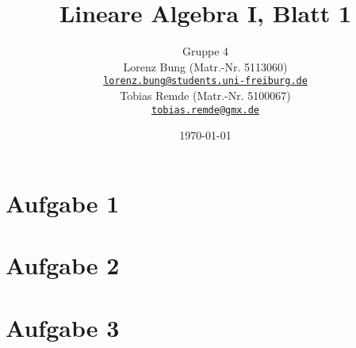 \documentclass[12pt,a4paper]{article}
\title{Lineare Algebra I, Blatt 1}
\author{Gruppe 4\\
    Lorenz Bung (Matr.-Nr. 5113060)\\
    \href{mailto:lorenz.bung@students.uni-freiburg.de}{\texttt{lorenz.bung@students.uni-freiburg.de}}\\
    Tobias Remde (Matr.-Nr. 5100067)\\
    \href{mailto:tobias.remde@gmx.de}{\texttt{tobias.remde@gmx.de}}
}
\date{\today}
\begin{document}
\maketitle


\section*{Aufgabe 1}


\section*{Aufgabe 2}


\section*{Aufgabe 3}


\end{document}
